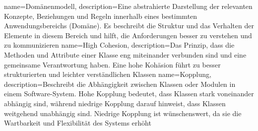 {
    name={Domänenmodell},
    description={Eine abstrahierte Darstellung der relevanten Konzepte, Beziehungen und Regeln innerhalb eines bestimmten Anwendungsbereichs (Domäne). Es beschreibt die Struktur und das Verhalten der Elemente in diesem Bereich und hilft, die Anforderungen besser zu verstehen und zu kommunizieren}
}
{
    name={High Cohesion},
    description={Das Prinzip, dass die Methoden und Attribute einer Klasse eng miteinander verbunden sind und eine gemeinsame Verantwortung haben. Eine hohe Kohäsion führt zu besser strukturierten und leichter verständlichen Klassen}
}
{
    name={Kopplung},
    description={Beschreibt die Abhängigkeit zwischen Klassen oder Modulen in einem Software-System. Hohe Kopplung bedeutet, dass Klassen stark voneinander abhängig sind, während niedrige Kopplung darauf hinweist, dass Klassen weitgehend unabhängig sind. Niedrige Kopplung ist wünschenswert, da sie die Wartbarkeit und Flexibilität des Systems erhöht}
}

